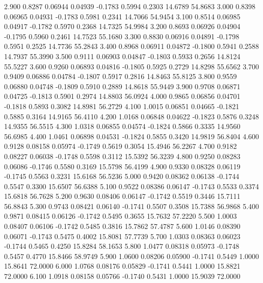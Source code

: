    2.900   0.8287   0.06944   0.04939  -0.1783   0.5994   0.2303  14.6789  54.8683
   3.000   0.8398   0.06965   0.04931  -0.1783   0.5981   0.2341  14.7066  54.9454
   3.100   0.8514   0.06985   0.04917  -0.1782   0.5970   0.2368  14.7325  54.9984
   3.200   0.8693   0.06926   0.04904  -0.1795   0.5960   0.2461  14.7523  55.1680
   3.300   0.8830   0.06916   0.04891  -0.1798   0.5951   0.2525  14.7736  55.2843
   3.400   0.8968   0.06911   0.04872  -0.1800   0.5941   0.2588  14.7937  55.3990
   3.500   0.9111   0.06903   0.04847  -0.1803   0.5933   0.2656  14.8124  55.5227
   3.600   0.9260   0.06893   0.04816  -0.1805   0.5925   0.2729  14.8298  55.6562
   3.700   0.9409   0.06886   0.04784  -0.1807   0.5917   0.2816  14.8463  55.8125
   3.800   0.9559   0.06880   0.04748  -0.1809   0.5910   0.2889  14.8618  55.9449
   3.900   0.9708   0.06871   0.04725  -0.1813   0.5901   0.2974  14.8803  56.0924
   4.000   0.9865   0.06856   0.04701  -0.1818   0.5893   0.3082  14.8981  56.2729
   4.100   1.0015   0.06851   0.04665  -0.1821   0.5885   0.3164  14.9165  56.4110
   4.200   1.0168   0.06848   0.04622  -0.1823   0.5876   0.3248  14.9355  56.5515
   4.300   1.0318   0.06855   0.04574  -0.1824   0.5866   0.3335  14.9560  56.6985
   4.400   1.0461   0.06898   0.04531  -0.1824   0.5855   0.3420  14.9819  56.8404
   4.600   0.9128   0.08158   0.05974  -0.1749   0.5619   0.3054  15.4946  56.2267
   4.700   0.9182   0.08227   0.06038  -0.1748   0.5598   0.3112  15.5392  56.3239
   4.800   0.9250   0.08283   0.06086  -0.1746   0.5580   0.3169  15.5798  56.4199
   4.900   0.9330   0.08328   0.06119  -0.1745   0.5563   0.3231  15.6168  56.5236
   5.000   0.9420   0.08362   0.06138  -0.1744   0.5547   0.3300  15.6507  56.6388
   5.100   0.9522   0.08386   0.06147  -0.1743   0.5533   0.3374  15.6818  56.7628
   5.200   0.9630   0.08406   0.06147  -0.1742   0.5519   0.3446  15.7111  56.8843
   5.300   0.9743   0.08421   0.06140  -0.1741   0.5507   0.3508  15.7388  56.9868
   5.400   0.9871   0.08415   0.06126  -0.1742   0.5495   0.3655  15.7632  57.2220
   5.500   1.0003   0.08407   0.06106  -0.1742   0.5485   0.3816  15.7862  57.4787
   5.600   1.0146   0.08390   0.06071  -0.1743   0.5475   0.4002  15.8081  57.7739
   5.700   1.0303   0.08363   0.06023  -0.1744   0.5465   0.4250  15.8284  58.1653
   5.800   1.0477   0.08318   0.05973  -0.1748   0.5457   0.4770  15.8466  58.9749
   5.900   1.0600   0.08206   0.05900  -0.1741   0.5449   1.0000  15.8641  72.0000
   6.000   1.0768   0.08176   0.05829  -0.1741   0.5441   1.0000  15.8821  72.0000
   6.100   1.0918   0.08158   0.05766  -0.1740   0.5431   1.0000  15.9039  72.0000
